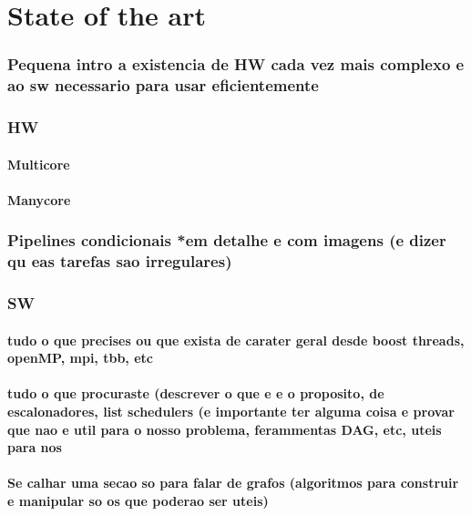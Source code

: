\chapter{State of the art}



\subsection{Pequena intro a existencia de HW cada vez mais complexo e ao sw necessario para usar eficientemente}

\subsection{HW}
\subsubsection{Multicore}
\subsubsection{Manycore}
\subsection{Pipelines condicionais *em detalhe e com imagens (e dizer qu eas tarefas sao irregulares)}
\subsection{SW}
\subsubsection{tudo o que precises ou que exista de carater geral desde boost threads, openMP, mpi, tbb, etc}
\subsubsection{tudo o que procuraste (descrever o que e e o proposito, de escalonadores, list schedulers (e importante ter alguma coisa e provar que nao e util para o nosso problema, ferammentas DAG, etc, uteis para nos }
\subsubsection{Se calhar uma secao so para falar de grafos (algoritmos para construir e manipular so os que poderao ser uteis)}